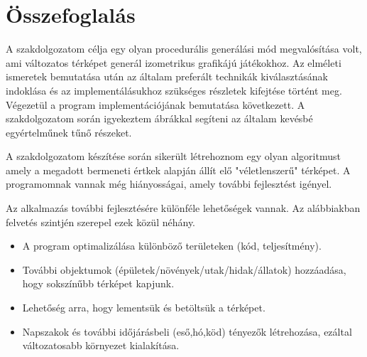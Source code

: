 \chapter*{Összefoglalás}

A szakdolgozatom célja egy olyan procedurális generálási mód megvalósítása volt, ami változatos térképet generál izometrikus grafikájú játékokhoz. Az elméleti ismeretek bemutatása után az általam preferált technikák kiválasztásának indoklása és az implementálásukhoz szükséges részletek kifejtése történt meg. Végezetül a program implementációjának bemutatása következett. A szakdolgozatom során igyekeztem ábrákkal segíteni az általam kevésbé egyértelműnek tűnő részeket. 

\bigskip

\noindent A szakdolgozatom készítése során sikerült létrehoznom egy olyan algoritmust amely a megadott bermeneti értkek alapján állít elő "véletlenszerű" térképet. A programomnak vannak még hiányosságai, amely további fejlesztést igényel.

\bigskip

\noindent Az alkalmazás további fejlesztésére különféle lehetőségek vannak. Az alábbiakban felvetés szintjén szerepel ezek közül néhány.
\begin{itemize}
\item A program optimalizálása különböző területeken (kód, teljesítmény).
\item További objektumok (épületek/növények/utak/hidak/állatok) hozzáadása, hogy sokszínűbb térképet kapjunk.
\item Lehetőség arra, hogy lementsük és betöltsük a térképet.
\item Napszakok és további időjárásbeli (eső,hó,köd) tényezők létrehozása, ezáltal változatosabb környezet kialakítása. 
\end{itemize}
